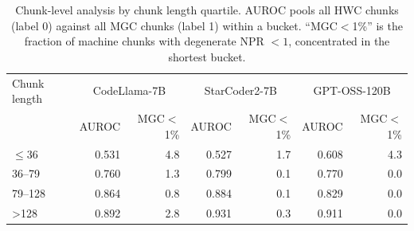 \begin{table}[t]
\centering
\caption{Chunk-level analysis by chunk length quartile. AUROC pools all HWC chunks (label 0) against all MGC chunks (label 1) within a bucket. ``MGC$<$1\%'' is the fraction of machine chunks with degenerate NPR $<1$, concentrated in the shortest bucket.}
\label{tab:chunk-by-length}
\begin{tabular}{lrrrrrr}
\toprule
Chunk length & \multicolumn{2}{c}{CodeLlama-7B} & \multicolumn{2}{c}{StarCoder2-7B} & \multicolumn{2}{c}{GPT-OSS-120B} \\
 & AUROC & MGC$<$1\% & AUROC & MGC$<$1\% & AUROC & MGC$<$1\% \\
\midrule
$\leq$36 & 0.531 & 4.8 & 0.527 & 1.7 & 0.608 & 4.3 \\
36--79 & 0.760 & 1.3 & 0.799 & 0.1 & 0.770 & 0.0 \\
79--128 & 0.864 & 0.8 & 0.884 & 0.1 & 0.829 & 0.0 \\
>128 & 0.892 & 2.8 & 0.931 & 0.3 & 0.911 & 0.0 \\
\bottomrule
\end{tabular}
\end{table}
